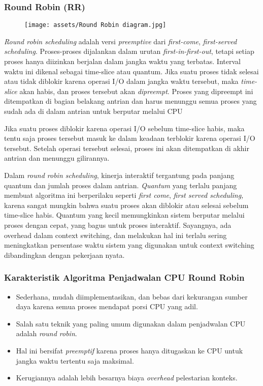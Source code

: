 \documentclass[12pt]{article}
\begin{document}
	\subsubsection{Round Robin (RR)}
        \begin{figure} [h]
        \centering
        \texttt{[image: assets/Round Robin diagram.jpg]}
        \label{fig:diagram}
        \end{figure}
		\textit{Round robin scheduling} adalah versi \textit{preemptive} dari \textit{first-come}, \textit{first-served scheduling}. Proses-proses dijalankan dalam urutan \textit{first-in-first-out}, tetapi setiap proses hanya diizinkan berjalan dalam jangka waktu yang terbatas. Interval waktu ini dikenal sebagai time-slice atau quantum. Jika suatu proses tidak selesai atau tidak diblokir karena operasi I/O dalam jangka waktu tersebut, maka \textit{time-slice} akan habis, dan proses tersebut akan \textit{dipreempt}. Proses yang dipreempt ini ditempatkan di bagian belakang antrian dan harus menunggu semua proses yang sudah ada di dalam antrian untuk berputar melalui CPU
		\par Jika suatu proses diblokir karena operasi I/O sebelum time-slice habis, maka tentu saja proses tersebut masuk ke dalam keadaan terblokir karena operasi I/O tersebut. Setelah operasi tersebut selesai, proses ini akan ditempatkan di akhir antrian dan menunggu gilirannya.
		\par Dalam \textit{round robin scheduling}, kinerja interaktif tergantung pada panjang quantum dan jumlah proses dalam antrian. \textit{Quantum} yang terlalu panjang membuat algoritma ini berperilaku seperti \textit{first come}, \textit{first served scheduling,} karena sangat mungkin bahwa suatu proses akan diblokir atau selesai sebelum time-slice habis. Quantum yang kecil memungkinkan sistem berputar melalui proses dengan cepat, yang bagus untuk proses interaktif. Sayangnya, ada overhead dalam context switching, dan melakukan hal ini terlalu sering meningkatkan persentase waktu sistem yang digunakan untuk context switching dibandingkan dengan pekerjaan nyata.
		
		\subsubsection*{Karakteristik Algoritma Penjadwalan CPU Round Robin}
		\begin{itemize}
			\item Sederhana, mudah diimplementasikan, dan bebas dari kekurangan sumber daya karena semua proses mendapat porsi CPU yang adil.
			\item Salah satu teknik yang paling umum digunakan dalam penjadwalan CPU adalah \textit{round robin}.
			\item Hal ini bersifat \textit{preemptif} karena proses hanya ditugaskan ke CPU untuk jangka waktu tertentu saja maksimal.
			\item Kerugiannya adalah lebih besarnya biaya \textit{overhead} pelestarian konteks.
		\end{itemize}
		
\end{document}
